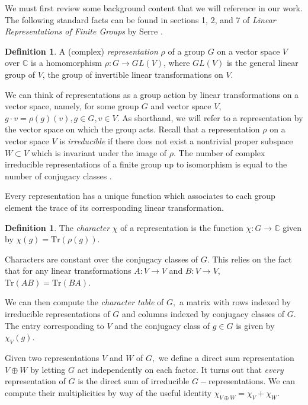 \documentclass{amsart}
\theoremstyle{plain}
\theoremstyle{definition}
\newtheorem{definition}[theorem]{Definition}
\newcommand{\C}{\mathbb{C}}
\newcommand{\trace}{\mathrm{Tr}}
\begin{document}
We must first review some background content that we will reference in our work. 
The following standard facts can be found in sections 1, 2, and 7 of \textit{Linear Representations of Finite Groups} by Serre \cite{Serre77}. 

\begin{definition}
    A (complex) \textit{representation} $\rho$ of a group $G$ on a vector space $V$ over $\C$ is a homomorphism $\rho: G \rightarrow GL(V)$, where $GL(V)$ is the general linear group of $V$, the group of invertible linear transformations on $V$. 
\end{definition}

We can think of representations as a group action by linear transformations on a vector space, namely, for some group $G$ and vector space $V$, $g \cdot v = \rho (g) (v), g \in G, v \in V$. As shorthand, we will refer to a representation by the vector space on which the group acts. Recall that a representation $\rho$ on a vector space $V$ is \textit{irreducible} if there does not exist a nontrivial proper subspace $W \subset V$ which is invariant under the image of $\rho$. The number of complex irreducible representations of a finite group up to isomorphism is equal to the number of conjugacy classes \cite[Theorem 2.7]{Serre77}. 

Every representation has a unique function which associates to each group element the trace of its corresponding linear transformation. 
\begin{definition}
    The \textit{character} $\chi$ of a representation is the function $\chi: G \to \mathbb{C}$ given by $\chi (g) = \trace(\rho(g)) $. 
\end{definition}

Characters are constant over the conjugacy classes of $G$. This relies on the fact that for any linear transformations $A: V \rightarrow V$ and $B: V \rightarrow V$, $\trace(AB)=\trace(BA)$. 

We can then compute the \textit{character table} of $G,$ a matrix with rows indexed by irreducible representations of $G$ and columns indexed by conjugacy classes of $G.$ The entry corresponding to $V$ and the conjugacy class of $g \in G$ is given by $\chi_V(g). $  

Given two representations $V$ and $W$ of $G,$ we define a direct sum representation $V\oplus W$ by letting $G$ act independently on each factor. It turns out that \textit{every } representation of $G$ is the direct sum of irreducible $G-$representations. We can compute their multiplicities by way of the useful identity $\chi_{V\oplus W}= \chi_V+\chi_W. $
\end{document}
